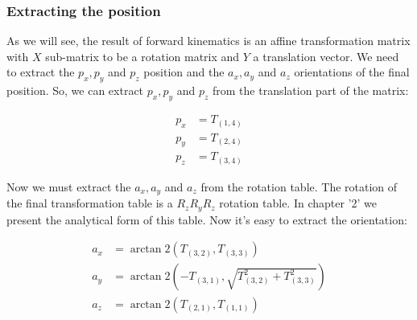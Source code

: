 \subsubsection*{Extracting the position}
As we will see, the result of forward kinematics is an affine transformation matrix with $X$ sub-matrix to be a rotation matrix and $Y$ a translation vector. We need to extract the $p_x,p_y$ and $p_z$ position and the $a_x,a_y$ and $a_z$ orientations of the final position. So, we can extract $p_x,p_y$ and $p_z$ from the translation part of the matrix:
\begin{small}
\begin{align*}
p_x &= T_{(1,4)}\\
p_y &= T_{(2,4)}\\
p_z &= T_{(3,4)}
\end{align*}
\end{small}
Now we must extract the $a_x,a_y$ and $a_z$ from the rotation table. The rotation of the final transformation table is a $R_zR_yR_z$ rotation table. In chapter '2' we present the analytical form of this table. Now it's easy to extract the orientation:
\begin{small}
\begin{align*}
a_x &= \arctan2\left(T_{(3,2)},T_{(3,3)}\right)\\
a_y &= \arctan2\left(-T_{(3,1)},\sqrt{T^2_{(3,2)} + T^2_{(3,3)}}\right)\\
a_z &= \arctan2\left(T_{(2,1)},T_{(1,1)}\right)
\end{align*}
\end{small}

